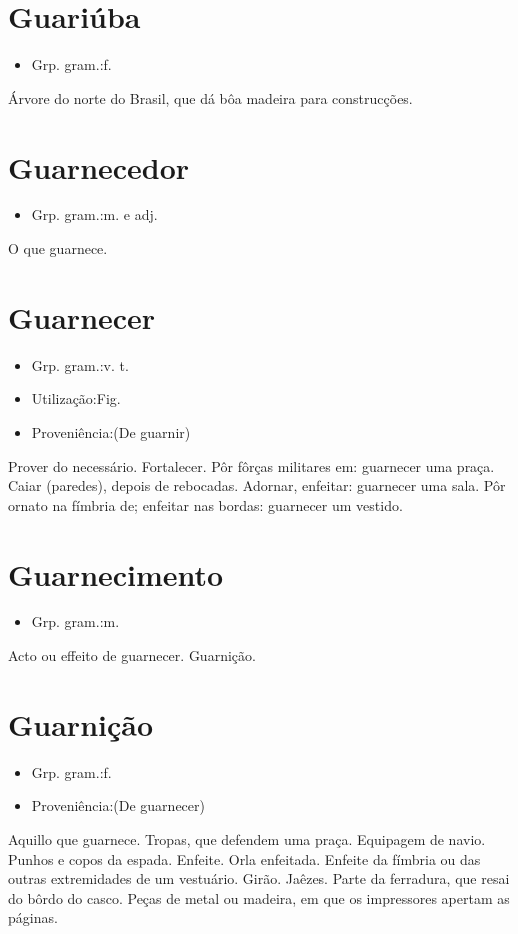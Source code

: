 \section{Guariúba}
\begin{itemize}
\item {Grp. gram.:f.}
\end{itemize}
Árvore do norte do Brasil, que dá bôa madeira para construcções.
\section{Guarnecedor}
\begin{itemize}
\item {Grp. gram.:m.  e  adj.}
\end{itemize}
O que guarnece.
\section{Guarnecer}
\begin{itemize}
\item {Grp. gram.:v. t.}
\end{itemize}
\begin{itemize}
\item {Utilização:Fig.}
\end{itemize}
\begin{itemize}
\item {Proveniência:(De \textunderscore guarnir\textunderscore )}
\end{itemize}
Prover do necessário.
Fortalecer.
Pôr fôrças militares em: \textunderscore guarnecer uma praça\textunderscore .
Caiar (paredes), depois de rebocadas.
Adornar, enfeitar: \textunderscore guarnecer uma sala\textunderscore .
Pôr ornato na fímbria de; enfeitar nas bordas: \textunderscore guarnecer um vestido\textunderscore .
\section{Guarnecimento}
\begin{itemize}
\item {Grp. gram.:m.}
\end{itemize}
Acto ou effeito de guarnecer.
Guarnição.
\section{Guarnição}
\begin{itemize}
\item {Grp. gram.:f.}
\end{itemize}
\begin{itemize}
\item {Proveniência:(De \textunderscore guarnecer\textunderscore )}
\end{itemize}
Aquillo que guarnece.
Tropas, que defendem uma praça.
Equipagem de navio.
Punhos e copos da espada.
Enfeite.
Orla enfeitada.
Enfeite da fímbria ou das outras extremidades de um vestuário.
Girão.
Jaêzes.
Parte da ferradura, que resai do bôrdo do casco.
Peças de metal ou madeira, em que os impressores apertam as páginas.
